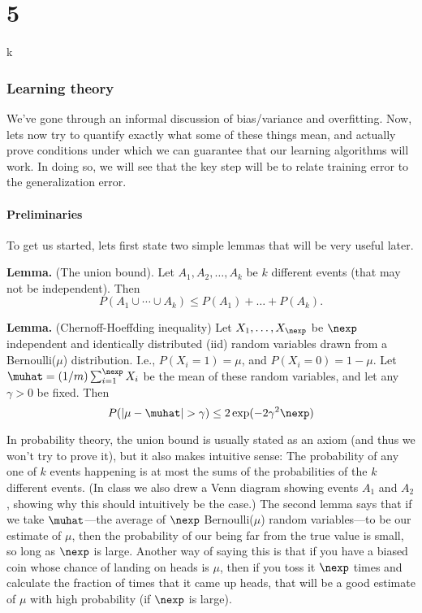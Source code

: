 
\part{5}

k\section{Learning theory}

We've gone through an informal discussion of bias/variance and overfitting.
Now, lets now try to quantify exactly what some of these things mean,
and actually prove conditions under which we can guarantee that our learning
algorithms will work.  
In doing so, we will see that the key step will be to relate training
error to the generalization error.  

\subsection{Preliminaries}

To get us started, lets first state two simple lemmas that will be very useful
later.

\noindent
{\bf Lemma.} (The union bound).  Let $A_1, A_2, \ldots, A_k$ be $k$ different
events (that may not be independent).  Then  
\[
P(A_1 \cup \cdots \cup A_k) \leq P(A_1) + \ldots + P(A_k).
\]

\noindent
{\bf Lemma.} (Chernoff-Hoeffding inequality)  Let $X_1, \ldots, X_{\nexp}$ be $\nexp$
independent and identically distributed (iid) random variables drawn from
a Bernoulli($\mu$) distribution.  I.e., $P(X_i = 1) = \mu$, and $P(X_i=0) = 1-\mu$. 
Let $\muhat = (1/m) \sum_{i=1}^\nexp X_i$ be the mean of these random variables,
and let any $\gamma > 0$ be fixed.  Then 
\[
P(|\mu - \muhat| > \gamma) \leq 2 \exp(-2\gamma^2 \nexp)
\]

In probability theory, the union bound is usually stated as an axiom
(and thus we won't try to prove it), but it also makes intuitive sense: The probability of 
any one of $k$ events happening is at most the sums of the probabilities of the $k$
different events.  (In class we also drew a Venn diagram showing events $A_1$ 
and $A_2$, showing why this should intuitively be the case.)  The second lemma says
that if we take $\muhat$---the average of $\nexp$ Bernoulli($\mu$) random variables---to
be our estimate of $\mu$, then the probability of our being far from the true
value is small, so long as $\nexp$ is large.  Another way of saying this is that if you
have a biased coin whose chance of landing on heads is $\mu$, then if you toss it $\nexp$
times and calculate the fraction of times that it came up heads, that will 
be a good estimate of $\mu$ with high probability (if $\nexp$ is large).


